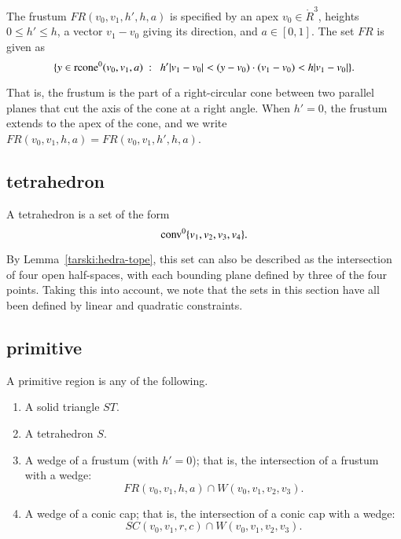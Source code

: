 \begin{definition} The frustum
$FR(v_0,v_1,h',h,a)$ is specified by an apex $v_0\in\ring{R}^3$, heights
$0\le h'\le h$, a vector $v_1-v_0$ giving its direction, and
$a\in[0,1]$. The set $FR$ is given as
    $$
    \{ y \in\op{rcone}^0(v_0,v_1,a) \mid \ 
       h'|v_1-v_0| < (y-v_0) \cdot (v_1-v_0) < h|v_1-v_0| \}.
    $$
\end{definition}

That is, the frustum is the part of a right-circular cone between two
parallel planes that cut the axis of the cone at a right angle.
When $h'=0$, the frustum extends to the apex of the cone, and
we write $FR(v_0,v_1,h,a)=FR(v_0,v_1,h',h,a)$.

\subsection{tetrahedron}

\begin{definition} A tetrahedron is a set of the form
$${\operatorname{conv}}^0\{v_1,v_2,v_3,v_4\}.$$
\end{definition}

By Lemma~\ref{tarski:hedra-tope}, this set can also be described
as the intersection of four open half-spaces, with each bounding
plane defined by three of the four points.
Taking this into account, we note that
the sets in this section have all been defined by linear and quadratic
constraints.

\subsection{primitive}

\begin{definition} A primitive region is any of the following.

\begin{enumerate}%
 \item A solid triangle $ST$.
 \item A tetrahedron $S$.
 \item A wedge of a frustum (with $h'=0$); 
that is, the intersection of a frustum with
 a wedge:
    $$
     FR(v_0,v_1,h,a) \cap W(v_0,v_1,v_2,v_3).
    $$
\item A wedge of a conic cap; that is, the intersection of a conic cap
with
    a wedge:
    $$
    SC(v_0,v_1,r,c) \cap W(v_0,v_1,v_2,v_3).
    $$
\end{enumerate}

\end{definition}


